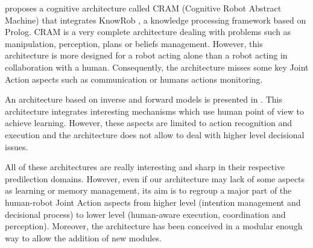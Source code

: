 \documentclass[english,a4paper,11pt,twoside]{StyleThese}
\begin{document}
\cite{beetz2010cram} proposes a cognitive architecture called CRAM (Cognitive Robot Abstract Machine) that integrates KnowRob \cite{tenorth2013knowrob}, a knowledge processing framework based on Prolog. CRAM is a very complete architecture dealing with problems such as manipulation, perception, plans or beliefs management. However, this architecture is more designed for a robot acting alone than a robot acting in collaboration with a human. Consequently, the architecture misses some key Joint Action aspects such as communication or humans actions monitoring.

An architecture based on inverse and forward models is presented in \cite{demiris2006hierarchical}. This architecture integrates interesting mechanisms which use human point of view to achieve learning. However, these aspects are limited to action recognition and execution and the architecture does not allow to deal with higher level decisional issues.

All of these architectures are really interesting and sharp in their respective predilection domains. However, even if our architecture may lack of some aspects as learning or memory management, its aim is to regroup a major part of the human-robot Joint Action aspects from higher level (intention management and decisional process) to lower level (human-aware execution, coordination and perception). Moreover, the architecture has been conceived in a modular enough way to allow the addition of new modules.

\ifdefined{}
\else


\end{document}
